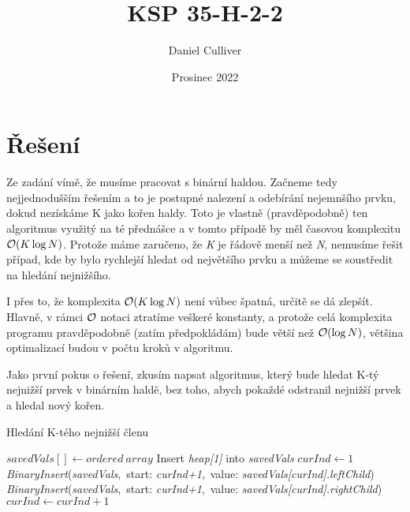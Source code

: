 \documentclass{../../../ksp}
\title{KSP 35-H-2-2}
\author{Daniel Culliver}
\date{Prosinec 2022}
\begin{document}
\maketitle

\section*{Řešení}

Ze zadání vímě, že musíme pracovat s binární haldou.
Začneme tedy nejjednodušším řešením a to je postupné nalezení a odebírání nejemnšího prvku,
dokud nezískáme K jako kořen haldy. Toto je vlastně (pravděpodobně) ten algoritmus využitý na té přednášce
a v tomto případě by měl časovou komplexitu $\mathcal{O}(K \log{N})$.
Protože máme zaručeno, že \emph{K} je řádově menší než \emph{N}, nemusíme řešit případ,
kde by bylo rychlejší hledat od největšího prvku a můžeme se soustředit na hledání nejnižšího.


I přes to, že komplexita $\mathcal{O}(K \log{N})$ není vůbec špatná, určitě se dá zlepšít. Hlavně, v rámci
$\mathcal{O}$ notaci ztratíme veškeré konstanty, a protože celá komplexita programu pravděpodobně
(zatím předpokládám) bude větší než $\mathcal{O}(\log{N})$, většina optimalizací budou v počtu kroků v algoritmu.

Jako první pokus o řešení, zkusím napsat algoritmus, který bude hledat K-tý nejnižší prvek v binárním haldě,
bez toho, abych pokaždé odstranil nejnižší prvek a hledal nový kořen.

\begin{algorithm}
    \caption{Hledání K-tého nejnižší členu}
    \begin{algorithmic}[1]
            \State $savedVals[] \gets ordered\ array$ 
            \State Insert \emph{heap[1]} into \emph{savedVals} 
            \State $curInd \gets 1$ 
                    \State \emph{BinaryInsert}(\emph{savedVals},\ start: \emph{curInd+1},\ value: \emph{savedVals[curInd].leftChild})
                    \State \emph{BinaryInsert}(\emph{savedVals},\ start: \emph{curInd+1},\ value: \emph{savedVals[curInd].rightChild})
                \EndIf
                \State $curInd \gets curInd+1$
            \EndWhile
    \end{algorithmic}
\end{algorithm}
\end{document}
